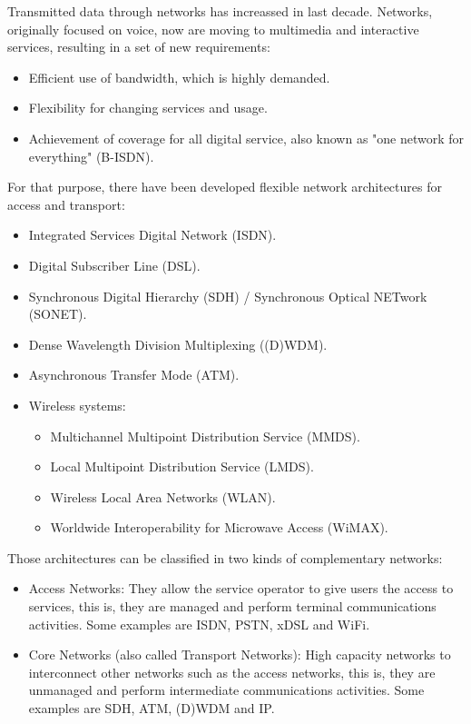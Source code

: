 \documentclass[
	12pt,
	twoside
]{book}
\begin{document}
Transmitted data through networks has increassed in last decade. Networks, originally focused on voice, now are moving to multimedia and interactive services, resulting in a set of new requirements:

\begin{itemize}
	\item Efficient use of bandwidth, which is highly demanded.
	\item Flexibility for changing services and usage.
	\item Achievement of coverage for all digital service, also known as "one network for everything" (B-ISDN).
\end{itemize}

For that purpose, there have been developed flexible network architectures for access and transport:

\begin{itemize}
	\item Integrated Services Digital Network (ISDN).
	\item Digital Subscriber Line (DSL).
	\item Synchronous Digital Hierarchy (SDH) / Synchronous Optical NETwork (SONET).
	\item Dense Wavelength Division Multiplexing ((D)WDM).
	\item Asynchronous Transfer Mode (ATM).
	\item {
		Wireless systems:
		\begin{itemize}
			\item Multichannel Multipoint Distribution Service (MMDS).
			\item Local Multipoint Distribution Service (LMDS).
			\item Wireless Local Area Networks (WLAN).
			\item Worldwide Interoperability for Microwave Access (WiMAX).
		\end{itemize}
	}
\end{itemize}

Those architectures can be classified in two kinds of complementary networks:

\begin{itemize}
	\item Access Networks: They allow the service operator to give users the access to services, this is, they are managed and perform terminal communications activities. Some examples are ISDN, PSTN, xDSL and WiFi.
	\item Core Networks (also called Transport Networks): High capacity networks to interconnect other networks such as the access networks, this is, they are unmanaged and perform intermediate communications activities. Some examples are SDH, ATM, (D)WDM and IP.
\end{itemize}
\end{document}
